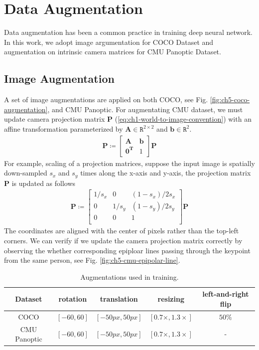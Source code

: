 \section{Data Augmentation}
Data augmentation has been a common practice in training deep neural network. In this work, we adopt image argumentation for COCO Dataset and augmentation on intrinsic camera matrices for CMU Panoptic Dataset.
\subsection{Image Augmentation}
A set of image augmentations are applied on both COCO, see Fig. \ref{fig:ch5-coco-augmentation}, and CMU Panoptic. For augmentating CMU dataset, we must update camera projection matrix $\mathbf{P}$ (\ref{eq:ch1-world-to-image-convention}) with an affine transformation parameterized by $\mathbf{A} \in \mathtt{R}^{2 \times 2}$ and $\mathbf{b} \in \mathtt{R}^2$.
\begin{gather}
\mathbf{P} \coloneqq 
\begin{bmatrix}
\mathbf{A} & \mathbf{b}\\
\mathbf{0^T} & 1
\end{bmatrix}
\mathbf{P}
\end{gather}
For example, scaling of a projection matrices, suppose the input image is spatially down-sampled $s_x$ and $s_y$ times along the x-axis and y-axis, the projection matrix $\mathbf{P}$ is updated as follows
\begin{gather}
\mathbf{P} \coloneqq 
\begin{bmatrix}
1/s_x & 0 & (1-s_x)/2s_x\\
0 & 1/s_y & (1-s_y)/2s_y\\
0 & 0 & 1\\
\end{bmatrix}
\mathbf{P}
\end{gather}
The coordinates are aligned with the center of pixels rather than the top-left corners. We can verify if we update the camera projection matrix correctly by observing the whether corresponding epiploar lines passing through the keypoint from the same person, see Fig. \ref{fig:ch5-cmu-epipolar-line}.

\begin{table}[htpb]
	\caption[Augmentations used in training]{Augmentations used in training.}\label{ch5:coco-definition}
	\centering
	\begin{tabular}{|c|c|c|c|c|}
		\toprule
		Dataset & rotation & translation & resizing & left-and-right flip \\ \hline
		COCO & $[-60, 60]$ & $[-50px,50px]$ & $[0.7\times, 1.3\times]$ & $50\%$ \\ \hline
		CMU Panoptic & $[-60, 60]$ & $[-50px,50px]$ & $[0.7\times, 1.3\times]$ & - \\ \hline
		\bottomrule
	\end{tabular}	
\end{table}

